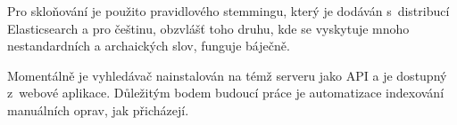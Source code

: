 Pro skloňování je použito pravidlového stemmingu, který je dodáván s~distribucí
Elasticsearch a pro češtinu, obzvlášť toho druhu, kde se vyskytuje mnoho
nestandardních a archaických slov, funguje báječně.

Momentálně je vyhledávač nainstalován na témž serveru jako API a je dostupný
z~webové aplikace. Důležitým bodem budoucí práce je automatizace indexování
manuálních oprav, jak přicházejí.

